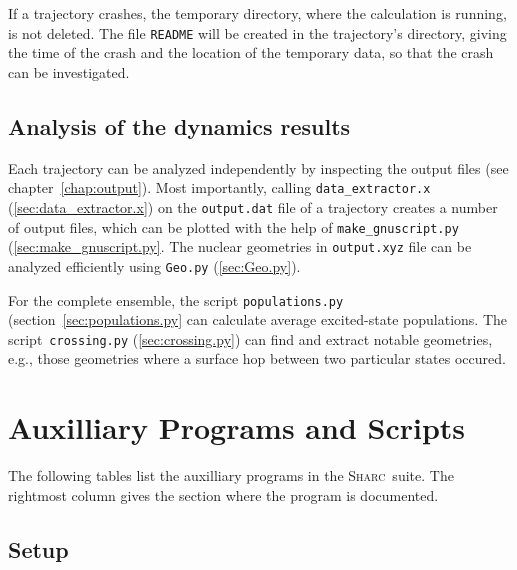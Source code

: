 \documentclass[a4paper,11pt,DIV=15,openany,twoside=false]{scrbook}
\newcommand{\sharc}{\textsc{Sharc}}
\newcommand{\ttt}[1]{\texttt{#1}}
\begin{document}
If a trajectory crashes, the temporary directory, where the calculation is running, is not deleted. The file \ttt{README} will be created in the trajectory's directory, giving the time of the crash and the location of the temporary data, so that the crash can be investigated. 

\subsection{Analysis of the dynamics results}

Each trajectory can be analyzed independently by inspecting the output files (see chapter~\ref{chap:output}). Most importantly, calling \ttt{data\_extractor.x} (\ref{sec:data_extractor.x}) on the \ttt{output.dat} file of a trajectory creates a number of output files, which can be plotted with the help of \ttt{make\_gnuscript.py} (\ref{sec:make_gnuscript.py}.
The nuclear geometries in \ttt{output.xyz} file can be analyzed efficiently using \ttt{Geo.py} (\ref{sec:Geo.py}).

For the complete ensemble, the script \ttt{populations.py} (section~\ref{sec:populations.py} can calculate average excited-state populations. The script~\ttt{crossing.py} (\ref{sec:crossing.py}) can find and extract notable geometries, e.g., those geometries where a surface hop between two particular states occured.

\section{Auxilliary Programs and Scripts}

The following tables list the auxilliary programs in the \sharc\ suite. The rightmost column gives the section where the program is documented.

\subsection{Setup}
\end{document}
